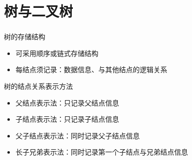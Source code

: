 \section{树与二叉树}


\begin{frame}
    \frametitle{\insertsectionhead}
    \begin{block}{树的存储结构}
        \begin{itemize}
            \item 可采用\alert{顺序}或\alert{链式}存储结构
            \item 每结点须记录：数据信息、与其他结点的逻辑关系
        \end{itemize}
    \end{block}
    \pause
    \begin{block}{树的结点关系表示方法}
        \begin{itemize}
            \item 父结点表示法：只记录父结点信息
            \item 子结点表示法：只记录子结点信息
            \item 父子结点表示法：同时记录父子结点信息
            \item 长子兄弟表示法：同时记录第一个子结点与兄弟结点信息
        \end{itemize}
    \end{block}
\end{frame}

